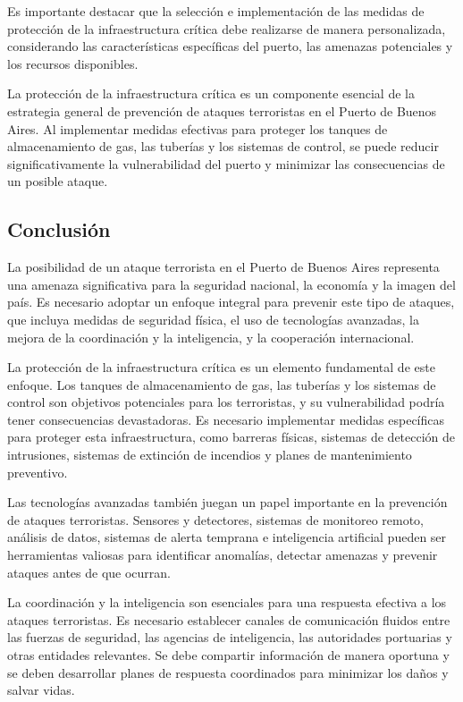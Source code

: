 \documentclass{article}
\begin{document}
Es importante destacar que la selección e implementación de las medidas
de protección de la infraestructura crítica debe realizarse de manera
personalizada, considerando las características específicas del puerto,
las amenazas potenciales y los recursos disponibles.

La protección de la infraestructura crítica es un componente esencial de
la estrategia general de prevención de ataques terroristas en el Puerto
de Buenos Aires. Al implementar medidas efectivas para proteger los
tanques de almacenamiento de gas, las tuberías y los sistemas de
control, se puede reducir significativamente la vulnerabilidad del
puerto y minimizar las consecuencias de un posible ataque.

\hypertarget{conclusiuxf3n-1}{%
\subsection{Conclusión}\label{conclusiuxf3n-1}}

La posibilidad de un ataque terrorista en el Puerto de Buenos Aires
representa una amenaza significativa para la seguridad nacional, la
economía y la imagen del país. Es necesario adoptar un enfoque integral
para prevenir este tipo de ataques, que incluya medidas de seguridad
física, el uso de tecnologías avanzadas, la mejora de la coordinación y
la inteligencia, y la cooperación internacional.

La protección de la infraestructura crítica es un elemento fundamental
de este enfoque. Los tanques de almacenamiento de gas, las tuberías y
los sistemas de control son objetivos potenciales para los terroristas,
y su vulnerabilidad podría tener consecuencias devastadoras. Es
necesario implementar medidas específicas para proteger esta
infraestructura, como barreras físicas, sistemas de detección de
intrusiones, sistemas de extinción de incendios y planes de
mantenimiento preventivo.

Las tecnologías avanzadas también juegan un papel importante en la
prevención de ataques terroristas. Sensores y detectores, sistemas de
monitoreo remoto, análisis de datos, sistemas de alerta temprana e
inteligencia artificial pueden ser herramientas valiosas para
identificar anomalías, detectar amenazas y prevenir ataques antes de que
ocurran.

La coordinación y la inteligencia son esenciales para una respuesta
efectiva a los ataques terroristas. Es necesario establecer canales de
comunicación fluidos entre las fuerzas de seguridad, las agencias de
inteligencia, las autoridades portuarias y otras entidades relevantes.
Se debe compartir información de manera oportuna y se deben desarrollar
planes de respuesta coordinados para minimizar los daños y salvar vidas.
\end{document}

